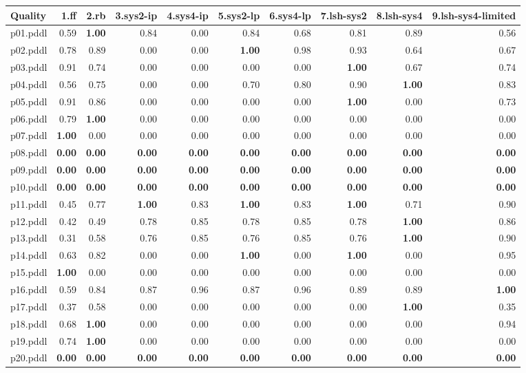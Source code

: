 \documentclass{article}
\begin{document}
\begin{tabular}{@{}lrrrrrrrrr@{}}
Quality & 1.ff & 2.rb & 3.sys2-ip & 4.sys4-ip & 5.sys2-lp & 6.sys4-lp & 7.lsh-sys2 & 8.lsh-sys4 & 9.lsh-sys4-limited \\
\midrule
p01.pddl & 0.59 & \textbf{1.00} & 0.84 & 0.00 & 0.84 & 0.68 & 0.81 & 0.89 & 0.56 \\
p02.pddl & 0.78 & 0.89 & 0.00 & 0.00 & \textbf{1.00} & 0.98 & 0.93 & 0.64 & 0.67 \\
p03.pddl & 0.91 & 0.74 & 0.00 & 0.00 & 0.00 & 0.00 & \textbf{1.00} & 0.67 & 0.74 \\
p04.pddl & 0.56 & 0.75 & 0.00 & 0.00 & 0.70 & 0.80 & 0.90 & \textbf{1.00} & 0.83 \\
p05.pddl & 0.91 & 0.86 & 0.00 & 0.00 & 0.00 & 0.00 & \textbf{1.00} & 0.00 & 0.73 \\
p06.pddl & 0.79 & \textbf{1.00} & 0.00 & 0.00 & 0.00 & 0.00 & 0.00 & 0.00 & 0.00 \\
p07.pddl & \textbf{1.00} & 0.00 & 0.00 & 0.00 & 0.00 & 0.00 & 0.00 & 0.00 & 0.00 \\
p08.pddl & \textbf{0.00} & \textbf{0.00} & \textbf{0.00} & \textbf{0.00} & \textbf{0.00} & \textbf{0.00} & \textbf{0.00} & \textbf{0.00} & \textbf{0.00} \\
p09.pddl & \textbf{0.00} & \textbf{0.00} & \textbf{0.00} & \textbf{0.00} & \textbf{0.00} & \textbf{0.00} & \textbf{0.00} & \textbf{0.00} & \textbf{0.00} \\
p10.pddl & \textbf{0.00} & \textbf{0.00} & \textbf{0.00} & \textbf{0.00} & \textbf{0.00} & \textbf{0.00} & \textbf{0.00} & \textbf{0.00} & \textbf{0.00} \\
p11.pddl & 0.45 & 0.77 & \textbf{1.00} & 0.83 & \textbf{1.00} & 0.83 & \textbf{1.00} & 0.71 & 0.90 \\
p12.pddl & 0.42 & 0.49 & 0.78 & 0.85 & 0.78 & 0.85 & 0.78 & \textbf{1.00} & 0.86 \\
p13.pddl & 0.31 & 0.58 & 0.76 & 0.85 & 0.76 & 0.85 & 0.76 & \textbf{1.00} & 0.90 \\
p14.pddl & 0.63 & 0.82 & 0.00 & 0.00 & \textbf{1.00} & 0.00 & \textbf{1.00} & 0.00 & 0.95 \\
p15.pddl & \textbf{1.00} & 0.00 & 0.00 & 0.00 & 0.00 & 0.00 & 0.00 & 0.00 & 0.00 \\
p16.pddl & 0.59 & 0.84 & 0.87 & 0.96 & 0.87 & 0.96 & 0.89 & 0.89 & \textbf{1.00} \\
p17.pddl & 0.37 & 0.58 & 0.00 & 0.00 & 0.00 & 0.00 & 0.00 & \textbf{1.00} & 0.35 \\
p18.pddl & 0.68 & \textbf{1.00} & 0.00 & 0.00 & 0.00 & 0.00 & 0.00 & 0.00 & 0.94 \\
p19.pddl & 0.74 & \textbf{1.00} & 0.00 & 0.00 & 0.00 & 0.00 & 0.00 & 0.00 & 0.00 \\
p20.pddl & \textbf{0.00} & \textbf{0.00} & \textbf{0.00} & \textbf{0.00} & \textbf{0.00} & \textbf{0.00} & \textbf{0.00} & \textbf{0.00} & \textbf{0.00} \\
\end{tabular}
\end{document}
